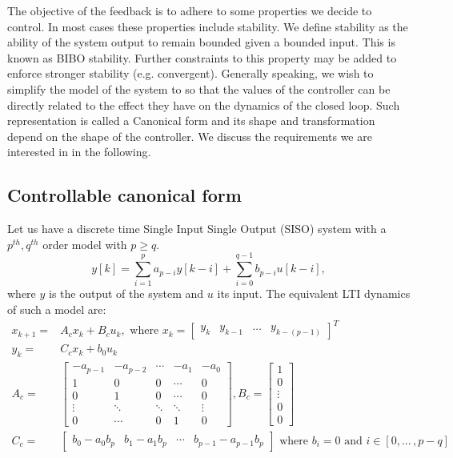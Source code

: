 \documentclass[sigconf]{llncs}
\newcommand{\mat}[1]{{#1}}
\renewcommand{\vec}[1]{{#1}}
\begin{document}
The objective of the feedback is to adhere to some properties we decide to control.
In most cases these properties include stability.  We define stability as the ability of
the system output to remain bounded given a bounded input. This is known as BIBO
stability. Further constraints to this property may be added to enforce stronger stability 
(e.g. convergent).  Generally speaking, we wish to simplify the model of the system to
so that the values of the controller can be directly related to the effect they have on the
dynamics of the closed loop.  Such representation is called a Canonical form and its shape
and transformation depend on the shape of the controller.  We discuss the requirements
we are interested in in the following.

\subsection{Controllable canonical form} \label{sec:reachable}

Let us have a discrete time Single Input Single Output (SISO) system with a $p^{th},q^{th}$ order model with $p\geq q$.
$$y[k]=\sum_{i=1}^p a_{p-i}y[k-i]+\sum_{i=0}^{q-1} b_{p-i}u[k-i],$$
where $y$ is the output of the system and $u$ its input.
The equivalent LTI dynamics of such a model are:
\begin{align}
\label{eq:cf_SISO}
\vec{x}_{k+1}=&\mat{A}_c\vec{x}_k+\mat{B}_cu_k, \text{ where } \vec{x}_k=[\begin{array}{cccc}y_k&y_{k-1}&\hdots&y_{k-(p-1)}\end{array}]^T\\
y_k=&\mat{C}_c\vec{x}_k + b_0u_k\nonumber\\
\mat{A}_c=&\left[
\begin{array}{ccccc}
-a_{p-1}&-a_{p-2}&\cdots&-a_1&-a_0\\
1&0&0&\cdots&0\\
0&1&0&\cdots&0\\
\vdots&\ddots&\ddots&\ddots&\vdots\\
0&\cdots&0&1&0
\end{array}\right],
\mat{B}_c=\left[
\begin{array}{c}
1\\0\\ \vdots\\ 0\\ 0
\end{array}\right]\nonumber\\
\mat{C}_c=&[\begin{array}{ccccc}b_0-a_0b_p&b_1-a_1b_p&\cdots&b_{p-1}-a_{p-1}b_p\end{array}] \text{ where } b_i=0 \text{ and } i \in [0, ...\,,p-q]\nonumber
\end{align}
\end{document}
